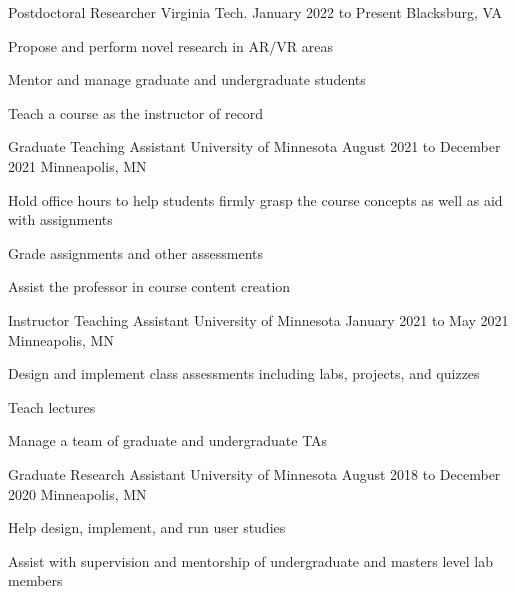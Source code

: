 
\begin{cventries}
  \cventry
    {Postdoctoral Researcher} %
    {Virginia Tech.} %
    {January 2022 to Present} %
    {Blacksburg, VA} %
    {
      \begin{cvitems} %
        \item {Propose and perform novel research in AR/VR areas}
        \item {Mentor and manage graduate and undergraduate students}
		\item {Teach a course as the instructor of record}
      \end{cvitems}
    }
    
  \cventry
    {Graduate Teaching Assistant} %
    {University of Minnesota} %
    {August 2021 to December 2021} %
    {Minneapolis, MN} %
    {
      \begin{cvitems} %
        \item {Hold office hours to help students firmly grasp the course concepts as well as aid with assignments}
        \item {Grade assignments and other assessments}
		\item {Assist the professor in course content creation}
      \end{cvitems}
    }
    
  \cventry
    {Instructor Teaching Assistant} %
    {University of Minnesota} %
    {January 2021 to May 2021} %
    {Minneapolis, MN} %
    {
      \begin{cvitems} %
        \item {Design and implement class assessments including labs, projects, and quizzes}
        \item {Teach lectures}
		\item {Manage a team of graduate and undergraduate TAs}
      \end{cvitems}
    }
    
  \cventry
    {Graduate Research Assistant} %
    {University of Minnesota} %
    {August 2018 to December 2020} %
    {Minneapolis, MN} %
    {
      \begin{cvitems} %
        \item {Help design, implement, and run user studies}
		\item {Assist with supervision and mentorship of undergraduate and masters level lab members}
      \end{cvitems}
    }
    

\end{cventries}
